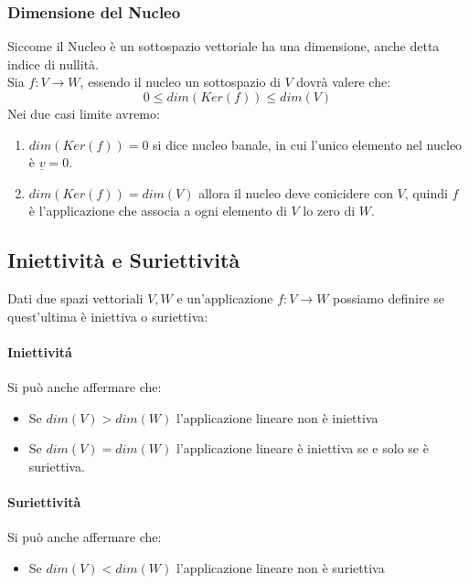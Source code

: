 \subsubsection{Dimensione del Nucleo}
Siccome il Nucleo è un sottospazio vettoriale ha una dimensione, anche detta indice di nullità.
\\Sia $f:V\to W$, essendo il nucleo un sottospazio di $V$ dovrà valere che:
\[ 0 \leq dim(Ker(f)) \leq dim(V) \]
Nei due casi limite avremo:
\begin{enumerate}
	\item $dim(Ker(f)) = 0$ si dice nucleo banale, in cui l'unico elemento nel nucleo è $\underline{v}=0$.
	\item $dim(Ker(f)) = dim(V)$ allora il nucleo deve conicidere con $V$, quindi $f$ è l'applicazione che associa a ogni elemento di $V$ lo zero di $W$.
\end{enumerate}


\subsection{Iniettività e Suriettività}
Dati due spazi vettoriali $V,W$ e un'applicazione $f:V\to W$ possiamo definire se quest'ultima è iniettiva o suriettiva:
\paragraph*{Iniettivitá}
Si può anche affermare che:
\begin{itemize}
	\item Se $dim(V)>dim(W)$ l'applicazione lineare non è iniettiva
	\item Se $dim(V)=dim(W)$ l'applicazione lineare è iniettiva se e solo se è suriettiva.
\end{itemize}

\paragraph*{Suriettività}
Si può anche affermare che:
\begin{itemize}
	\item Se $dim(V)<dim(W)$ l'applicazione lineare non è suriettiva
\end{itemize}

